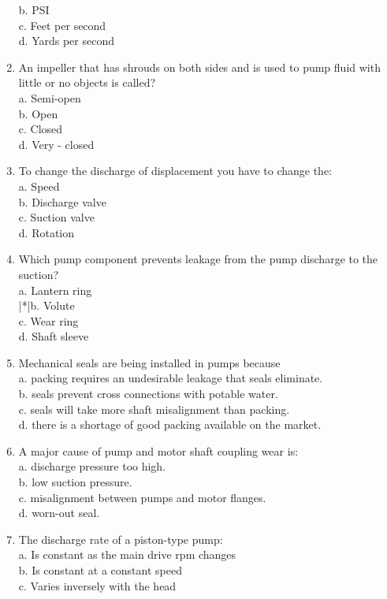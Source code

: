 \begin{enumerate}[1.]
b. PSI\\
c. Feet per second\\
d. Yards per second\\
\item An impeller that has shrouds on both sides and is used to pump fluid with little or no objects is called?\\
a. Semi-open\\
b. Open\\
c. Closed\\
d. Very - closed\\
\item To change the discharge of displacement you have to change the:\\
a. Speed\\
b. Discharge valve\\
c. Suction valve\\
d. Rotation\\
\item Which pump component prevents leakage from the pump discharge to the suction?\\
a. Lantern ring\\
|*|b. Volute\\
c. Wear ring\\
d. Shaft sleeve\\
\item Mechanical seals are being installed in pumps because\\
a. packing requires an undesirable leakage that seals eliminate.\\
b. seals prevent cross connections with potable water.\\
c. seals will take more shaft misalignment than packing.\\
d. there is a shortage of good packing available on the market.
\item A major cause of pump and motor shaft coupling wear is:\\
a. discharge pressure too high.\\
b. low suction pressure.\\
c. misalignment between pumps and motor flanges.\\
d. worn-out seal.\\
\item The discharge rate of a piston-type pump:\\
a. Is constant as the main drive rpm changes\\
b. Is constant at a constant speed\\
c. Varies inversely with the head\\

\end{enumerate}
